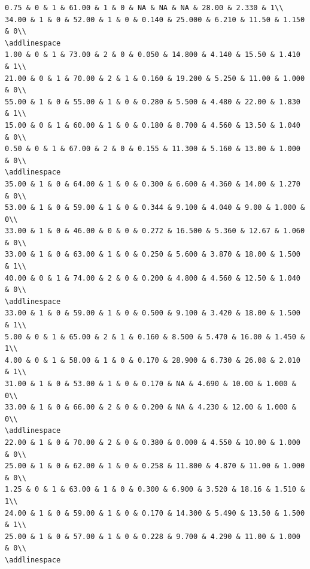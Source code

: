 \documentclass[
]{article}
\begin{document}
\begin{verbatim}
0.75 & 0 & 1 & 61.00 & 1 & 0 & NA & NA & NA & 28.00 & 2.330 & 1\\
34.00 & 1 & 0 & 52.00 & 1 & 0 & 0.140 & 25.000 & 6.210 & 11.50 & 1.150 & 0\\
\addlinespace
1.00 & 0 & 1 & 73.00 & 2 & 0 & 0.050 & 14.800 & 4.140 & 15.50 & 1.410 & 1\\
21.00 & 0 & 1 & 70.00 & 2 & 1 & 0.160 & 19.200 & 5.250 & 11.00 & 1.000 & 0\\
55.00 & 1 & 0 & 55.00 & 1 & 0 & 0.280 & 5.500 & 4.480 & 22.00 & 1.830 & 1\\
15.00 & 0 & 1 & 60.00 & 1 & 0 & 0.180 & 8.700 & 4.560 & 13.50 & 1.040 & 0\\
0.50 & 0 & 1 & 67.00 & 2 & 0 & 0.155 & 11.300 & 5.160 & 13.00 & 1.000 & 0\\
\addlinespace
35.00 & 1 & 0 & 64.00 & 1 & 0 & 0.300 & 6.600 & 4.360 & 14.00 & 1.270 & 0\\
53.00 & 1 & 0 & 59.00 & 1 & 0 & 0.344 & 9.100 & 4.040 & 9.00 & 1.000 & 0\\
33.00 & 1 & 0 & 46.00 & 0 & 0 & 0.272 & 16.500 & 5.360 & 12.67 & 1.060 & 0\\
33.00 & 1 & 0 & 63.00 & 1 & 0 & 0.250 & 5.600 & 3.870 & 18.00 & 1.500 & 1\\
40.00 & 0 & 1 & 74.00 & 2 & 0 & 0.200 & 4.800 & 4.560 & 12.50 & 1.040 & 0\\
\addlinespace
33.00 & 1 & 0 & 59.00 & 1 & 0 & 0.500 & 9.100 & 3.420 & 18.00 & 1.500 & 1\\
5.00 & 0 & 1 & 65.00 & 2 & 1 & 0.160 & 8.500 & 5.470 & 16.00 & 1.450 & 1\\
4.00 & 0 & 1 & 58.00 & 1 & 0 & 0.170 & 28.900 & 6.730 & 26.08 & 2.010 & 1\\
31.00 & 1 & 0 & 53.00 & 1 & 0 & 0.170 & NA & 4.690 & 10.00 & 1.000 & 0\\
33.00 & 1 & 0 & 66.00 & 2 & 0 & 0.200 & NA & 4.230 & 12.00 & 1.000 & 0\\
\addlinespace
22.00 & 1 & 0 & 70.00 & 2 & 0 & 0.380 & 0.000 & 4.550 & 10.00 & 1.000 & 0\\
25.00 & 1 & 0 & 62.00 & 1 & 0 & 0.258 & 11.800 & 4.870 & 11.00 & 1.000 & 0\\
1.25 & 0 & 1 & 63.00 & 1 & 0 & 0.300 & 6.900 & 3.520 & 18.16 & 1.510 & 1\\
24.00 & 1 & 0 & 59.00 & 1 & 0 & 0.170 & 14.300 & 5.490 & 13.50 & 1.500 & 1\\
25.00 & 1 & 0 & 57.00 & 1 & 0 & 0.228 & 9.700 & 4.290 & 11.00 & 1.000 & 0\\
\addlinespace

\end{verbatim}
\end{document}
